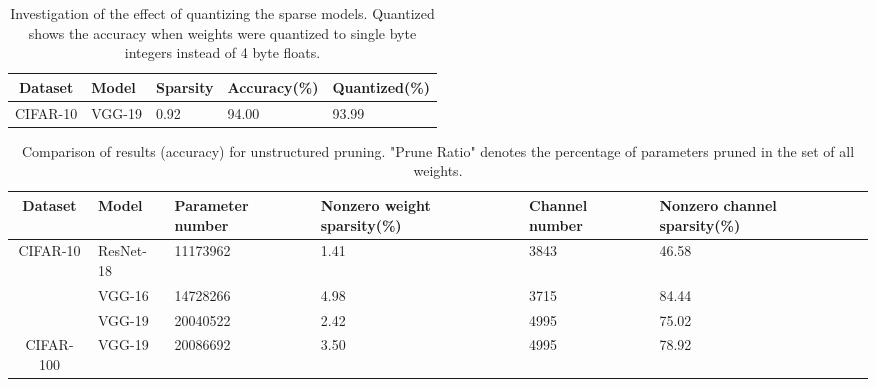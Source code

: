 \begin{table}[!htbp]
	\caption{Investigation of the effect of quantizing the sparse models. Quantized shows the accuracy when weights were quantized to single byte integers instead of 4 byte floats.}
	\centering
	\begin{tabular}{c|l|l|l|l}
	\hline
	 Dataset & Model & Sparsity & Accuracy(\%) & Quantized(\%) \\\hline
	 CIFAR-10 & VGG-19 & 0.92 & 94.00 & 93.99\\\hline
	\end{tabular}
\end{table}


\begin{table}[!htbp]
	\caption{Comparison of results (accuracy) for unstructured pruning. "Prune Ratio" denotes the percentage of parameters pruned in the set of all weights. }
	\centering
	\begin{tabular}{c|l|l|l|l|l}
		\hline
		Dataset & Model & Parameter number & Nonzero weight sparsity(\%) &  Channel number & Nonzero channel sparsity(\%)   \\\hline 
		\multirow{3}{*}{CIFAR-10} &  ResNet-18  & 11173962 & 1.41 & 3843 &   46.58 \\\cline{2-6}
         &  VGG-16  & 14728266 &    4.98&3715 & 84.44 \\\cline{2-6}
         & VGG-19 &20040522 &    2.42 &4995 &   75.02 \\\hline
        CIFAR-100 &  VGG-19  &20086692 &  3.50 & 4995 &    78.92 \\\hline
\end{tabular}
\end{table}

\begin{table}[!htbp]
	\caption{Comparison of channel numbers for original and pruned models of ResNet-18}
	\centering
{}
\end{table}


